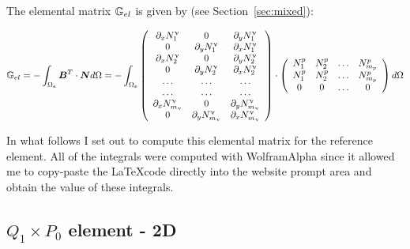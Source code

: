 The elemental matrix ${\mathbb{G}}_{el}$ is given by (see Section~\ref{sec:mixed}):

\[
{\mathbb{G}}_{el} = -\int_{\Omega_e} {\bm B}^T \cdot {\bm N} d\Omega
= -\int_{\Omega_e}
\left(
\begin{array}{ccc}
\partial_x N_1^\upnu & 0 & \partial_y N_1^\upnu \\
0 & \partial_y N_1^\upnu & \partial_x N_1^\upnu \\
\partial_x N_2^\upnu & 0 & \partial_y N_2^\upnu \\
0 & \partial_y N_2^\upnu & \partial_x N_2^\upnu \\
\dots & \dots & \dots \\
\dots & \dots & \dots \\
\partial_x N_{m_\upnu}^\upnu & 0 & \partial_y N_{m_\upnu}^\upnu \\
0 & \partial_y N_{m_\upnu}^\upnu & \partial_x N_{m_\upnu}^\upnu 
\end{array}
\right)
\cdot
\left(
\begin{array}{cccc}
N_1^p & N_2^p & \dots & N_{m_p}^p \\ 
N_1^p & N_2^p & \dots & N_{m_p}^p \\ 
0 & 0 & \dots & 0
\end{array}
\right)
d\Omega
\]

In what follows I set out to compute this elemental matrix for the reference element.
All of the integrals were computed with WolframAlpha since it allowed me to copy-paste 
the \LaTeX code directly into the website prompt area and obtain the value of these integrals.


\subsection{$Q_1\times P_0$ element - 2D}

